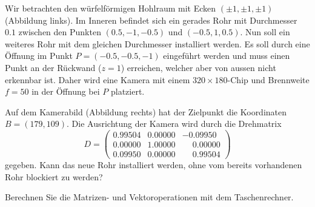 Wir betrachten den würfelförmigen Hohlraum mit Ecken $(\pm1,\pm1,\pm1)$
(Abbildung links).
Im Inneren befindet sich ein gerades Rohr mit Durchmesser $0.1$ zwischen
den Punkten $(0.5,-1,-0.5)$ und $(-0.5,1,0.5)$.
Nun soll ein weiteres Rohr mit dem gleichen Durchmesser installiert werden.
Es soll durch eine Öffnung im Punkt $P=(-0.5,-0.5,-1)$ eingeführt werden und 
muss einen Punkt an der Rückwand ($z=1$) erreichen, welcher aber von aussen nicht
erkennbar ist.
Daher wird eine Kamera mit einem $320\times 180$-Chip und Brennweite $f=50$
in der Öffnung bei $P$ platziert.
\begin{center}
\end{center}
Auf dem Kamerabild (Abbildung rechts) hat der Zielpunkt die Koordinaten
$B=(179,109)$.
Die Ausrichtung der Kamera wird durch die Drehmatrix
\[
D
=
\begin{pmatrix}
   0.99504 & 0.00000 &         - 0.09950\\
   0.00000 & 1.00000 &\phantom{-}0.00000\\
   0.09950 & 0.00000 &\phantom{-}0.99504
\end{pmatrix}
\]
gegeben.
Kann das neue Rohr installiert werden, ohne vom bereits vorhandenen
Rohr blockiert zu werden?

\begin{hinweis}
Berechnen Sie die Matrizen- und Vektoroperationen mit dem Taschenrechner.
\end{hinweis}


